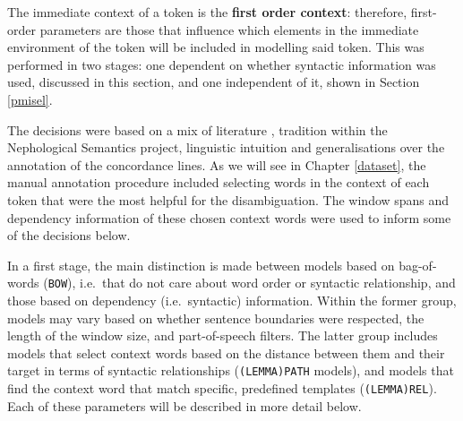\documentclass[
]{book}
\begin{document}
The immediate context of a token is the \textbf{first order context}: therefore, first-order parameters are those that influence which elements in the immediate environment of the token will be included in modelling said token. This was performed in two stages: one dependent on whether syntactic information was used, discussed in this section, and one independent of it, shown in Section \ref{pmisel}.

The decisions were based on a mix of literature \autocite[e.g.][]{kiela.clark_2014}, tradition within the Nephological Semantics project, linguistic intuition and generalisations over the annotation of the concordance lines. As we will see in Chapter \ref{dataset}, the manual annotation procedure included selecting words in the context of each token that were the most helpful for the disambiguation. The window spans and dependency information of these chosen context words were used to inform some of the decisions below.

In a first stage, the main distinction is made between models based on bag-of-words (\texttt{BOW}), i.e.~that do not care about word order or syntactic relationship, and those based on dependency (i.e.~syntactic) information. Within the former group, models may vary based on whether sentence boundaries were respected, the length of the window size, and part-of-speech filters. The latter group includes models that select context words based on the distance between them and their target in terms of syntactic relationships (\texttt{(LEMMA)PATH} models), and models that find the context word that match specific, predefined templates (\texttt{(LEMMA)REL}). Each of these parameters will be described in more detail below.
\end{document}
